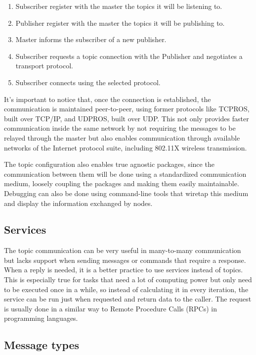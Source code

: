 \begin{enumerate}
\item Subscriber register with the master the topics it will be listening to.
\item Publisher register with the master the topics it will be publishing to.
\item Master informs the subscriber of a new publisher.
\item Subscriber requests a topic connection with the Publisher and negotiates a transport protocol.
\item Subscriber connects using the selected protocol.
\end{enumerate}

It's important to notice that, once the connection is established, the communication is maintained peer-to-peer, using former protocols like TCPROS, built over TCP/IP, and UDPROS, built over UDP. This not only provides faster communication inside the same network by not requiring the messages to be relayed through the master but also enables communication through available networks of the Internet protocol suite, including 802.11X wireless transmission.

The topic configuration also enables true agnostic packages, since the communication between them will be done using a standardized communication medium, loosely coupling the packages and making them easily maintainable. Debugging can also be done using command-line tools that wiretap this medium and display the information exchanged by nodes.

\subsection{Services}

The topic communication can be very useful in many-to-many communication but lacks support when sending messages or commands that require a response. When a reply is needed, it is a better practice to use services instead of topics. This is especially true for tasks that need a lot of computing power but only need to be executed once in a while, so instead of calculating it in every iteration, the service can be run just when requested and return data to the caller. The request is usually done in a similar way to Remote Procedure Calls (RPCs) in programming languages.

\subsection{Message types}

